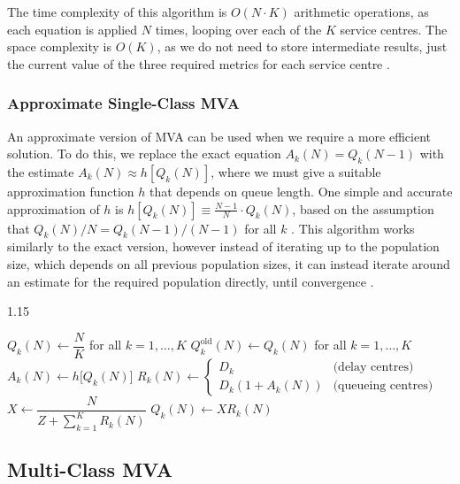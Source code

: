 The time complexity of this algorithm is $O(N \cdot K)$ arithmetic operations, as each equation is applied $N$ times, looping over each of the $K$ service centres. The space complexity is $O(K)$, as we do not need to store intermediate results, just the current value of the three required metrics for each service centre \cite{lazowska84,reiser80}.

\subsubsection*{Approximate Single-Class MVA}

An approximate version of MVA can be used when we require a more efficient solution. To do this, we replace the exact equation $A_k(N) = Q_k(N - 1)$ with the estimate $A_k(N) \approx h[Q_k(N)]$, where we must give a suitable approximation function $h$ that depends on queue length. One simple and accurate approximation of $h$ is $h[Q_k(N)] \equiv \frac{N - 1}{N} \cdot Q_k(N)$, based on the assumption that $Q_k(N)/N = Q_k(N - 1)/(N - 1)$ for all $k$ \cite{bard79}. This algorithm works similarly to the exact version, however instead of iterating up to the population size, which depends on all previous population sizes, it can instead iterate around an estimate for the required population directly, until convergence \cite{lazowska84}.

\begin{algorithm}
\caption{Approximate MVA for single-class models \cite{lazowska84}}
\begin{spacing}{1.15}
\begin{algorithmic}[1]
\State $Q_k(N) \gets \dfrac{N}{K}$ for all $k = 1,\ldots,K$
\Repeat
  \State $Q_k^{\text{old}}(N) \gets Q_k(N)$ for all $k = 1,\ldots,K$
    \State $A_k(N) \gets h\bigl[Q_k(N)\bigr]$
  \EndFor
    \State $R_k(N) \gets \begin{cases}D_k & \text{(delay centres)} \\ D_k (1 + A_k(N)) & \text{(queueing centres)}\end{cases}$
  \EndFor
  \State $X \gets \dfrac{N}{Z + \sum_{k=1}^{K} R_k(N)}$
    \State $Q_k(N) \gets X R_k(N)$
  \EndFor
{}
\end{algorithmic}
\end{spacing}
\end{algorithm} 

\subsection{Multi-Class MVA}
\label{sec:bg-mva-multi}

